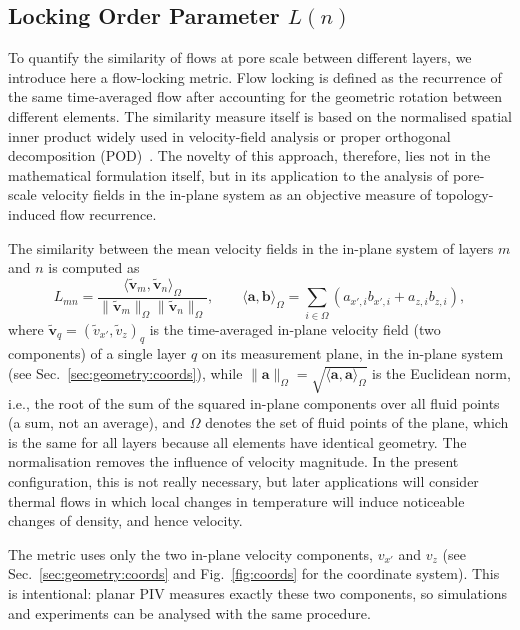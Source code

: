 \subsection{Locking Order Parameter \texorpdfstring{$L(n)$}{L(n)}}
\label{sec:locking:Ln}

To quantify the similarity of flows at pore scale between different layers, we introduce here a flow-locking metric. Flow locking is defined as the recurrence of the same time-averaged flow after accounting for the geometric rotation between different elements. The similarity measure itself is based on the normalised spatial inner product widely used in velocity-field analysis or proper orthogonal decomposition (POD)~\cite{lumley1967,sirovich1987,berkooz1993pod}. The novelty of this approach, therefore, lies not in the mathematical formulation itself, but in its application to the analysis of pore-scale velocity fields in the in-plane system as an objective measure of topology-induced flow recurrence.

The similarity between the mean velocity fields in the in-plane system of layers $m$ and $n$ is computed as
\begin{equation}
L_{mn}
=
\frac{\langle\tilde{\bm{v}}_m,\tilde{\bm{v}}_n\rangle_{\Omega}}
{\|\tilde{\bm{v}}_m\|_{\Omega}
\|\tilde{\bm{v}}_n\|_{\Omega}},
\qquad
\langle\bm{a},\bm{b}\rangle_{\Omega}
=
\sum_{i\in\Omega}
\left(
a_{x',i} b_{x',i}
+
a_{z,i} b_{z,i}
\right),
\label{eq:Ln}
\end{equation}
where $\tilde{\bm{v}}_q=(\tilde v_{x'},\tilde v_z)_q$ is the time-averaged in-plane velocity field (two components) of a single layer $q$ on its measurement plane, in the in-plane system (see Sec.~\ref{sec:geometry:coords}), while $\|\bm a\|_\Omega=\sqrt{\langle\bm a,\bm a\rangle_\Omega}$ is the Euclidean norm, i.e., the root of the sum of the squared in-plane components over all fluid points (a sum, not an average), and $\Omega$ denotes the set of fluid points of the plane, which is the same for all layers because all elements have identical geometry. The normalisation removes the influence of velocity magnitude. In the present configuration, this is not really necessary, but later applications will consider thermal flows in which local changes in temperature will induce noticeable changes of density, and hence velocity.

The metric uses only the two in-plane velocity components, $v_{x'}$ and $v_z$ (see Sec.~\ref{sec:geometry:coords} and Fig.~\ref{fig:coords} for the coordinate system). This is intentional: planar PIV measures exactly these two components, so simulations and experiments can be analysed with the same procedure.


